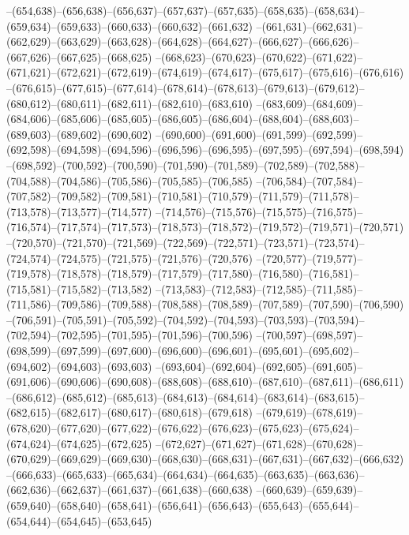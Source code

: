 --(654,638)--(656,638)--(656,637)--(657,637)--(657,635)--(658,635)--(658,634)--(659,634)--(659,633)--(660,633)--(660,632)--(661,632)
--(661,631)--(662,631)--(662,629)--(663,629)--(663,628)--(664,628)--(664,627)--(666,627)--(666,626)--(667,626)--(667,625)--(668,625)
--(668,623)--(670,623)--(670,622)--(671,622)--(671,621)--(672,621)--(672,619)--(674,619)--(674,617)--(675,617)--(675,616)--(676,616)
--(676,615)--(677,615)--(677,614)--(678,614)--(678,613)--(679,613)--(679,612)--(680,612)--(680,611)--(682,611)--(682,610)--(683,610)
--(683,609)--(684,609)--(684,606)--(685,606)--(685,605)--(686,605)--(686,604)--(688,604)--(688,603)--(689,603)--(689,602)--(690,602)
--(690,600)--(691,600)--(691,599)--(692,599)--(692,598)--(694,598)--(694,596)--(696,596)--(696,595)--(697,595)--(697,594)--(698,594)
--(698,592)--(700,592)--(700,590)--(701,590)--(701,589)--(702,589)--(702,588)--(704,588)--(704,586)--(705,586)--(705,585)--(706,585)
--(706,584)--(707,584)--(707,582)--(709,582)--(709,581)--(710,581)--(710,579)--(711,579)--(711,578)--(713,578)--(713,577)--(714,577)
--(714,576)--(715,576)--(715,575)--(716,575)--(716,574)--(717,574)--(717,573)--(718,573)--(718,572)--(719,572)--(719,571)--(720,571)
--(720,570)--(721,570)--(721,569)--(722,569)--(722,571)--(723,571)--(723,574)--(724,574)--(724,575)--(721,575)--(721,576)--(720,576)
--(720,577)--(719,577)--(719,578)--(718,578)--(718,579)--(717,579)--(717,580)--(716,580)--(716,581)--(715,581)--(715,582)--(713,582)
--(713,583)--(712,583)--(712,585)--(711,585)--(711,586)--(709,586)--(709,588)--(708,588)--(708,589)--(707,589)--(707,590)--(706,590)
--(706,591)--(705,591)--(705,592)--(704,592)--(704,593)--(703,593)--(703,594)--(702,594)--(702,595)--(701,595)--(701,596)--(700,596)
--(700,597)--(698,597)--(698,599)--(697,599)--(697,600)--(696,600)--(696,601)--(695,601)--(695,602)--(694,602)--(694,603)--(693,603)
--(693,604)--(692,604)--(692,605)--(691,605)--(691,606)--(690,606)--(690,608)--(688,608)--(688,610)--(687,610)--(687,611)--(686,611)
--(686,612)--(685,612)--(685,613)--(684,613)--(684,614)--(683,614)--(683,615)--(682,615)--(682,617)--(680,617)--(680,618)--(679,618)
--(679,619)--(678,619)--(678,620)--(677,620)--(677,622)--(676,622)--(676,623)--(675,623)--(675,624)--(674,624)--(674,625)--(672,625)
--(672,627)--(671,627)--(671,628)--(670,628)--(670,629)--(669,629)--(669,630)--(668,630)--(668,631)--(667,631)--(667,632)--(666,632)
--(666,633)--(665,633)--(665,634)--(664,634)--(664,635)--(663,635)--(663,636)--(662,636)--(662,637)--(661,637)--(661,638)--(660,638)
--(660,639)--(659,639)--(659,640)--(658,640)--(658,641)--(656,641)--(656,643)--(655,643)--(655,644)--(654,644)--(654,645)--(653,645)
